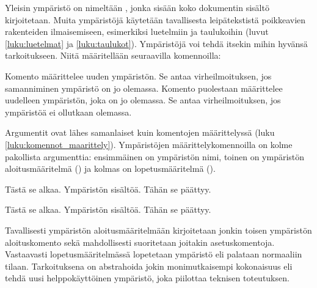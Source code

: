 Yleisin ympäristö on nimeltään , jonka sisään koko
dokumentin sisältö kirjoitetaan. Muita ympäristöjä käytetään
tavallisesta leipätekstistä poikkeavien rakenteiden ilmaisemiseen,
esimerkiksi luetelmiin ja taulukoihin (luvut \ref{luku:luetelmat} ja
\ref{luku:taulukot}). Ympäristöjä voi tehdä itsekin mihin hyvänsä
tarkoitukseen. Niitä määritellään seuraavilla komennoilla:

\begin{koodilohkosis}
\newenvironment   {nimi}[n][oletus]{aloitus}{lopetus}
\renewenvironment {nimi}[n][oletus]{aloitus}{lopetus}
\end{koodilohkosis}

Komento  määrittelee uuden ympäristön. Se antaa
virheilmoituksen, jos samanniminen ympäristö on jo olemassa. Komento
 puolestaan määrittelee uudelleen ympäristön,
joka on jo olemassa. Se antaa virheilmoituksen, jos ympäristöä ei
ollutkaan olemassa.

Argumentit ovat lähes samanlaiset kuin komentojen määrittelyssä (luku
\ref{luku:komennot_maarittely}). Ympäristöjen määrittelykomennoilla on
kolme pakollista argumenttia: ensimmäinen on ympäristön nimi, toinen on
ympäristön aloitusmääritelmä () ja kolmas on
lopetusmääritelmä ().

\begin{koodilohkosis}
\newenvironment{ymp}{Tästä se alkaa.}{Tähän se päättyy.}

\begin{ymp}
  Ympäristön sisältöä.
\end{ymp}
\end{koodilohkosis}

\begin{tulossis}
  Tästä se alkaa. Ympäristön sisältöä. Tähän se päättyy.
\end{tulossis}

Tavallisesti ympäristön aloitusmääritelmään kirjoitetaan jonkin toisen
ympäristön aloituskomento sekä mahdollisesti suoritetaan joitakin
asetuskomentoja. Vastaavasti lopetusmääritelmässä lopetetaan ympäristö
eli palataan normaaliin tilaan. Tarkoituksena on abstrahoida jokin
monimutkaisempi kokonaisuus eli tehdä uusi helppokäyttöinen ympäristö, joka
piilottaa teknisen toteutuksen.

\begin{koodilohkosis}
\newenvironment{ymp}
{\begin{mahtavuus}
    \omia\hienoja\asetuksia}
  {\end{mahtavuus}}
\end{koodilohkosis}

